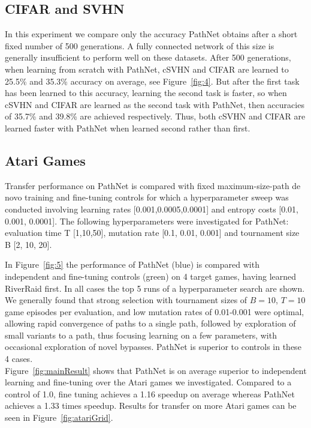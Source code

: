 \documentclass{sig-alternate-05-2015}
\begin{document}
\subsection{CIFAR and SVHN} 
In this experiment we compare only the accuracy PathNet obtains after a short fixed number of 500 generations. A fully connected network of this size is generally insufficient to perform well on these datasets. After 500 generations, when learning from scratch with PathNet, cSVHN and CIFAR are learned to 25.5\% and 35.3\% accuracy on average, see Figure~\ref{fig:4}. But after the first task has been learned to this accuracy, learning the second task is faster, so when cSVHN and CIFAR are learned as the second task with PathNet, then accuracies of 35.7\% and 39.8\% are achieved respectively. Thus, both cSVHN and CIFAR are learned faster with PathNet when learned second rather than first. 

\subsection{Atari Games} 
Transfer performance on PathNet is compared with fixed maximum-size-path de novo training and fine-tuning controls for which a hyperparameter sweep was conducted involving learning rates [0.001,0.0005,0.0001] and entropy costs [0.01, 0.001, 0.0001]. The following hyperparameters were investigated for PathNet: evaluation time T [1,10,50], mutation rate [0.1, 0.01, 0.001] and tournament size B [2, 10, 20].   

In Figure~\ref{fig:5} the performance of PathNet (blue) is compared with independent and fine-tuning controls (green) on 4 target games, having learned RiverRaid first. In all cases the top 5 runs of a hyperparameter search are shown. We generally found that strong selection with tournament sizes of \(B = 10\), \(T = 10\) game episodes per evaluation, and low mutation rates of 0.01-0.001 were optimal, allowing rapid convergence of paths to a single path, followed by exploration of small variants to a path, thus focusing learning on a few parameters, with occasional exploration of novel bypasses. PathNet is superior to controls in these 4 cases.  \\

Figure~\ref{fig:mainResult} shows that PathNet is on average superior to independent learning and fine-tuning over the Atari games we investigated. Compared to a control of 1.0, fine tuning achieves a 1.16 speedup on average whereas PathNet achieves a 1.33 times speedup. Results for transfer on more Atari games can be seen in Figure~\ref{fig:atariGrid}. \\
\end{document}
